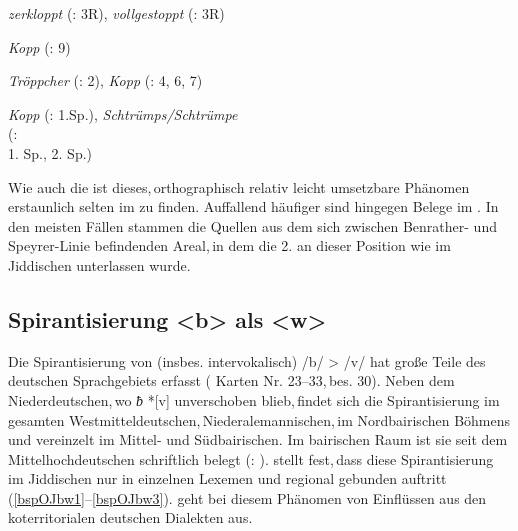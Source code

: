 {{\item   \textit{zerkloppt}  (: 3R), \textit{vollgestoppt}  (: 3R)\label{bsp2lv7}

\item \textit{Kopp}  (: 9) \label{bsp2lv8}

\item \textit{Tröppcher}  (: 2), \textit{Kopp}  (: 4, 6, 7) \label{bsp2lv9}

\item \textit{Kopp}  (: 1.Sp.), \textit{Schtrümps/Schtrümpe} \\ (:\\ 1. Sp., 2. Sp.) \label{bsp2lv10}  %
}


Wie auch die  ist dieses,\,orthographisch relativ leicht umsetzbare Phänomen erstaunlich selten im  zu finden. Auffallend häufiger sind hingegen Belege im . In den meisten Fällen stammen die Quellen aus dem sich zwischen Benrather- und Speyrer-Linie befindenden Areal,\,in dem die 2.  an dieser Position wie im Jiddischen unterlassen wurde.



\subsection{Spirantisierung <b> als <w>}\label{bw}
Die Spirantisierung von (insbes. intervokalisch) 
/b/ > /v/ hat große Teile des deutschen Sprachgebiets erfasst ( Karten Nr. 23–33,\,bes. 30). Neben dem Niederdeutschen,\,wo {\westgerm} \textit{ƀ} *[v] unverschoben blieb,\,findet  sich die Spirantisierung im gesamten Westmitteldeutschen,\,Niederalemannischen,\,im Nordbairischen Böhmens und vereinzelt im Mittel- und Südbairischen. Im bairischen Raum ist sie seit dem Mittelhochdeutschen schriftlich belegt (: \citeyear[Bd. 27,\,Sp. 4]{DeutschesWB}).  \cite[328,\,357]{Bin-Nun1973} stellt fest,\,dass diese Spirantisierung im Jiddischen nur in einzelnen Lexemen und regional gebunden auftritt (\ref{bspOJbw1}–\ref{bspOJbw3}). \cite[357]{Bin-Nun1973} geht bei diesem Phänomen von Einflüssen aus den koterritorialen deutschen Dialekten aus.


}

